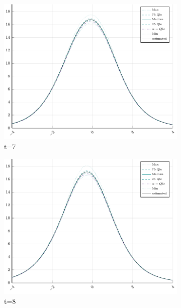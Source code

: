 \begin{figure}[H]
\begin{subfigure}[t]{0.31\textwidth}
		\includegraphics[width=\linewidth]{Figures/real/7_infoplot.pdf}
		\caption{t=7} 
	\end{subfigure}
	\begin{subfigure}[t]{0.31\textwidth}
		\centering
		\includegraphics[width=\linewidth]{Figures/real/8_infoplot.pdf}
		\caption{t=8} 
	\end{subfigure}\\
	\begin{subfigure}[t]{0.31\textwidth}
		\centering

\end{subfigure}
\end{figure}

